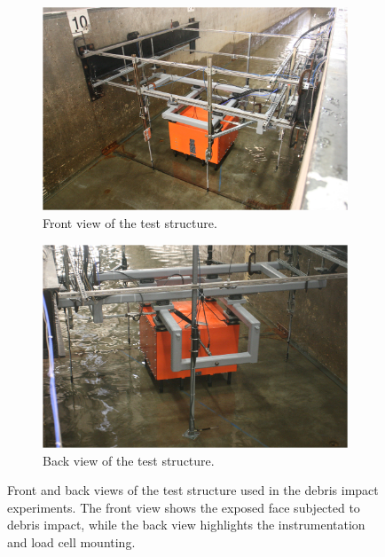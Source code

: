 \documentclass{article}
\begin{document}
{ \begin{figure}[htbp]
    \centering
    \begin{subfigure}[b]{0.48\textwidth}
        \centering
        \includegraphics[width=\textwidth]{TestStructureFrontView.png}
        \caption{Front view of the test structure.}
        \label{fig:teststructure_front}
    \end{subfigure}
    \hfill
    \begin{subfigure}[b]{0.48\textwidth}
        \centering
        \includegraphics[width=\textwidth]{TestStructureBackView.png}
        \caption{Back view of the test structure.}
        \label{fig:teststructure_back}
    \end{subfigure}
    \caption{Front and back views of the test structure used in the debris impact experiments. 
    The front view shows the exposed face subjected to debris impact, while the back view highlights the instrumentation and load cell mounting.}
    \label{fig:teststructure_views}
\end{figure}

}
\end{document}

